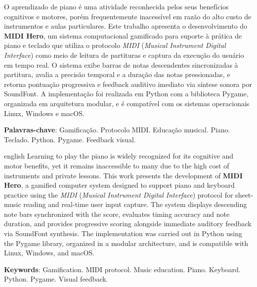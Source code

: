 \documentclass[
  12pt,
  openright,
  twoside,
  a4paper,
  english,
  brazil
]{abntex2}
\begin{document}
\setlength{\absparsep}{18pt}
\begin{resumo}
\noindent
O aprendizado de piano é uma atividade reconhecida pelos seus benefícios
cognitivos e motores, porém frequentemente inacessível em razão do alto
custo de instrumentos e aulas particulares. Este trabalho apresenta o
desenvolvimento do \textbf{MIDI Hero}, um sistema computacional
gamificado para suporte à prática de piano e teclado que utiliza o
protocolo \textit{MIDI} (\textit{Musical Instrument Digital Interface})
como meio de leitura de partituras e captura da execução do usuário em
tempo real. O sistema exibe barras de notas descendentes sincronizadas à
partitura, avalia a precisão temporal e a duração das notas pressionadas,
e retorna pontuação progressiva e feedback auditivo imediato via síntese
sonora por SoundFont. A implementação foi realizada em Python com a
biblioteca Pygame, organizada em arquitetura modular, e é compatível com
os sistemas operacionais Linux, Windows e macOS. %

\vspace{\onelineskip}
\noindent
\textbf{Palavras-chave}: Gamificação. Protocolo MIDI. Educação musical.
Piano. Teclado. Python. Pygame. Feedback visual.
\end{resumo}

\begin{resumo}[Abstract]
\begin{otherlanguage*}{english}
\noindent
Learning to play the piano is widely recognized for its cognitive and
motor benefits, yet it remains inaccessible to many due to the high cost
of instruments and private lessons. This work presents the development of
\textbf{MIDI Hero}, a gamified computer system designed to support piano
and keyboard practice using the \textit{MIDI} (\textit{Musical Instrument
Digital Interface}) protocol for sheet-music reading and real-time user
input capture. The system displays descending note bars synchronized with
the score, evaluates timing accuracy and note duration, and provides
progressive scoring alongside immediate auditory feedback via SoundFont
synthesis. The implementation was carried out in Python using the Pygame
library, organized in a modular architecture, and is compatible with
Linux, Windows, and macOS. %

\vspace{\onelineskip}
\noindent
\textbf{Keywords}: Gamification. MIDI protocol. Music education.
Piano. Keyboard. Python. Pygame. Visual feedback.
\end{otherlanguage*}
\end{resumo}
\end{document}
